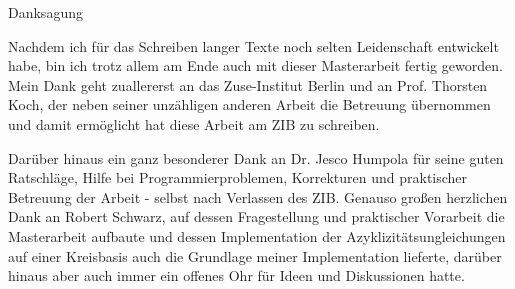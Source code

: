 \begin{huge}
Danksagung\\
 
\end{huge}


Nachdem ich für das Schreiben langer Texte noch selten Leidenschaft entwickelt habe, bin ich trotz allem am Ende auch 
mit dieser Masterarbeit fertig geworden. Mein Dank geht zuallererst an das Zuse-Institut Berlin und an Prof. Thorsten 
Koch, der neben seiner unzähligen anderen Arbeit die Betreuung übernommen und damit ermöglicht hat diese Arbeit am ZIB 
zu schreiben. 

Darüber hinaus ein ganz besonderer Dank an Dr. Jesco Humpola für seine guten Ratschläge, Hilfe bei 
Programmierproblemen, Korrekturen und praktischer Betreuung der Arbeit - selbst nach Verlassen des ZIB. Genauso großen 
herzlichen Dank an Robert Schwarz, auf dessen Fragestellung und praktischer Vorarbeit die Masterarbeit aufbaute und 
dessen Implementation der Azyklizitätsungleichungen auf einer Kreisbasis auch die Grundlage meiner Implementation 
lieferte, darüber hinaus aber auch immer ein offenes Ohr für Ideen und Diskussionen hatte.

